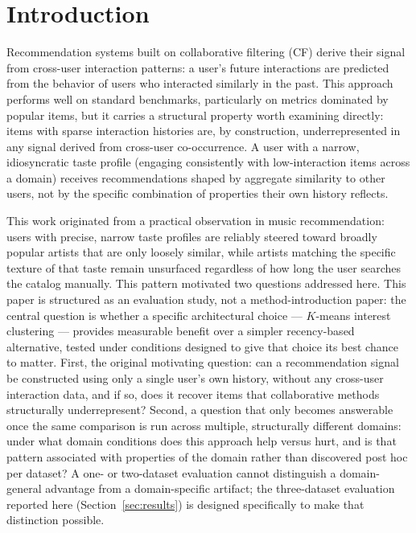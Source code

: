 \documentclass[11pt,a4paper]{article}
\begin{document}
\section{Introduction}

Recommendation systems built on collaborative filtering (CF) derive their
signal from cross-user interaction patterns: a user's future interactions are
predicted from the behavior of users who interacted similarly in the past.
This approach performs well on standard benchmarks, particularly on metrics
dominated by popular items, but it carries a structural property worth
examining directly: items with sparse interaction histories are, by
construction, underrepresented in any signal derived from cross-user
co-occurrence. A user with a narrow, idiosyncratic taste profile
(engaging consistently with low-interaction items across a domain) receives
recommendations shaped by aggregate similarity to other users, not by the
specific combination of properties their own history reflects.

This work originated from a practical observation in music recommendation:
users with precise, narrow taste profiles are reliably steered toward
broadly popular artists that are only loosely similar, while artists matching
the specific texture of that taste remain unsurfaced regardless of how long
the user searches the catalog manually. This pattern motivated two questions
addressed here. This paper is structured as an evaluation study, not a
method-introduction paper: the central question is whether a specific
architectural choice --- $K$-means interest clustering --- provides
measurable benefit over a simpler recency-based alternative, tested under
conditions designed to give that choice its best chance to matter. First, the original motivating question: can a recommendation
signal be constructed using only a single user's own history, without any
cross-user interaction data, and if so, does it recover items that collaborative methods
structurally underrepresent? Second, a question that only becomes answerable
once the same comparison is run across multiple, structurally different
domains: under what domain conditions does this approach help versus hurt,
and is that pattern associated with properties of the domain rather than
discovered post hoc per dataset? A one- or two-dataset evaluation cannot
distinguish a domain-general advantage from a domain-specific artifact; the
three-dataset evaluation reported here (Section~\ref{sec:results}) is
designed specifically to make that distinction possible.
\end{document}
